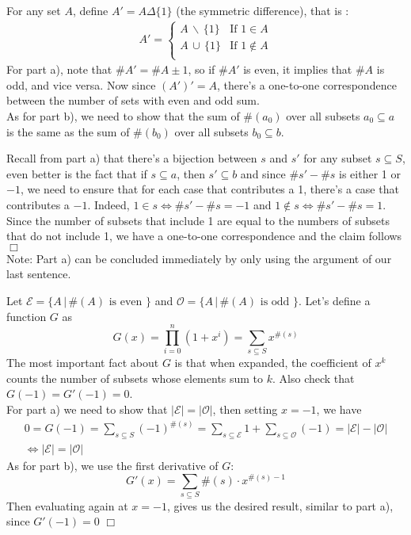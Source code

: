 \begin{solution} 
    For any set $A$, define $A' = A \Delta \{1\}$ (the symmetric difference), that is :
    \begin{align*}
        A' = 
        \begin{cases}
            A \, \backslash \, \{ 1 \} & \text{If } 1 \in A \\
            A \, \cup \, \{ 1 \} & \text{If } 1 \notin A \\
        \end{cases}
    \end{align*}
    For part a), note that $\# A' = \#A \pm 1$, so if $\# A'$ is even, it implies that $\#A$ is odd, and vice versa. Now since $(A')' = A$, there's a one-to-one correspondence between the number of sets with even and odd sum. \\[3mm]
    As for part b), we need to show that the sum of $\#(a_0)$ over all subsets $a_0 \subseteq a$ is the same as the sum of $\#(b_0)$ over all subsets $b_0 \subseteq b$.
    
    Recall from part a) that there's a bijection between $s$ and $s'$ for any subset $s \subseteq S$, even better is the fact that if $s \subseteq a$, then $s' \subseteq b$ and since $\#s' - \#s$ is either 1 or \(-1\), we need to ensure that for each case that contributes a 1, there's a case that contributes a \(-1\). Indeed, $1 \in s \iff \#s' - \#s = -1$ and $1 \notin s \iff \#s' - \#s = 1$. Since the number of subsets that include 1 are equal to the numbers of subsets that do not include 1, we have a one-to-one correspondence and the claim follows $\Box$  \\[2mm]
    Note: Part a) can be concluded immediately by only using the argument of our last sentence. 
\end{solution}

\begin{solution}
    Let $\mathcal{E} = \{ A \, | \, \#(A) \text{ is even } \}$ and $\mathcal{O} = \{ A \, | \, \#(A) \text{ is odd } \}$. Let's define a function $G$ as
    $$ G(x) = \prod_{i=0}^n (1 + x^i) = \sum_{s \subseteq S} x^{\#(s)}$$
    The most important fact about $G$ is that when expanded, the coefficient of $x^k$ counts the number of subsets whose elements sum to $k$. Also check that $G(-1) = G'(-1) =  0$. \\
    For part a) we need to show that $|\mathcal{E}| = |\mathcal{O}|$, then setting $x=-1$, we have 
    \begin{align*}
        0 = G(-1) = \sum_{s \subseteq S} (-1)^{\#(s)} = \sum_{s \subseteq \mathcal{E}} 1 + \sum_{s \subseteq \mathcal{O}} (-1) = |\mathcal{E}| - |\mathcal{O}| \\
        \iff |\mathcal{E}| = |\mathcal{O}| 
    \end{align*}
    As for part b), we use the first derivative of $G$: 
    $$ G'(x) = \sum_{s \subseteq S} \#(s) \cdot x^{\#(s) - 1}$$
    Then evaluating again at $x=-1$, gives us the desired result, similar to part a), since $G'(-1) = 0$ $\Box$
\end{solution}

